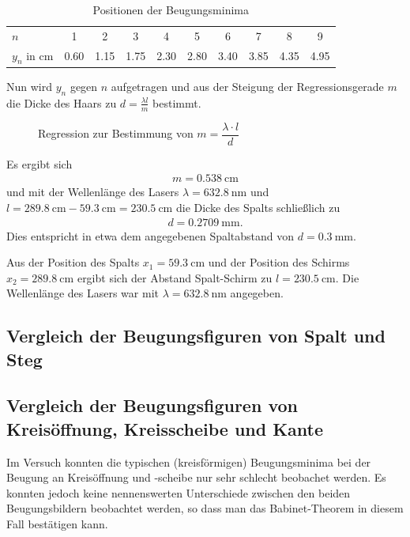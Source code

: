 \documentclass[ngerman, parskip*]{scrartcl}
\begin{document}
\begin{table}[!h]
\centering
\caption{Positionen der Beugungsminima}
\begin{tabular}{l|ccccccccc}
\toprule
$n$ & 1 & 2 & 3 & 4 & 5 & 6 & 7 & 8 & 9 \\ 
$y_n$ in $\si{\cm}$ & 0.60 & 1.15 & 1.75 & 2.30 & 2.80 & 3.40 & 3.85 & 4.35 & 4.95 \\ 
\bottomrule
\end{tabular}
\label{table:2_1}
\end{table}

Nun wird $y_n$ gegen $n$ aufgetragen und aus der Steigung der Regressionsgerade $m$ die Dicke des Haars zu $d = \frac{\lambda l}{m}$ bestimmt.

\begin{figure}
  \centering
  \caption{Regression zur Bestimmung von $m = \dfrac{\lambda \cdot l}{d}$ }
  
\end{figure}

Es ergibt sich 
\begin{align*}
  m = \SI {0,538}{\cm}
\end{align*}
und mit der Wellenlänge des Lasers $\lambda = \SI{632,8}{\nano\meter}$ und $l = \SI{289,8}{\cm} - \SI{59,3}{\cm} = \SI{230,5}{\cm}$ die Dicke des Spalts schließlich zu
\begin{align*}
  d = \SI{0,2709}{\milli\meter}.
\end{align*}
Dies entspricht in etwa dem angegebenen Spaltabstand von $ d = \SI{0,3}{\milli\meter}$.

Aus der Position des Spalts $x_1 = \SI{59,3}{\cm}$ und der Position des Schirms $x_2 = \SI{289,8}{\cm}$ ergibt sich der Abstand Spalt-Schirm zu $l = \SI{230,5}{\cm}$. Die Wellenlänge des Lasers war mit $\lambda = \SI{632,8}{\nano\meter}$ angegeben. 

\subsection{Vergleich der Beugungsfiguren von Spalt und Steg}


\subsection{Vergleich der Beugungsfiguren von Kreisöffnung, Kreisscheibe und Kante }

Im Versuch konnten die typischen (kreisförmigen) Beugungsminima bei der Beugung an Kreisöffnung und -scheibe nur sehr schlecht beobachet werden. Es konnten jedoch keine nennenswerten Unterschiede zwischen den beiden Beugungsbildern beobachtet werden, so dass man das Babinet-Theorem in diesem Fall bestätigen kann. 
\end{document}
